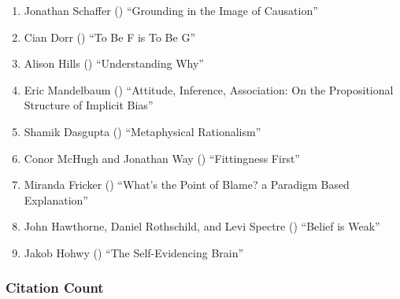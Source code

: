 \documentclass[
  10pt,
  letterpaper,
  DIV=11,
  numbers=noendperiod,
  twoside]{scrartcl}
\providecommand{\tightlist}{%
  \setlength{\itemsep}{0pt}\setlength{\parskip}{0pt}}\usepackage{longtable,booktabs,array}
\begin{document}
\begin{enumerate}
\def\labelenumi{\arabic{enumi}.}
\tightlist
\item
  Jonathan Schaffer ()
  ``Grounding in the Image of Causation''
\item
  Cian Dorr () ``To Be F is To Be
  G''
\item
  Alison Hills () ``Understanding
  Why''
\item
  Eric Mandelbaum () ``Attitude,
  Inference, Association: On the Propositional Structure of Implicit
  Bias''
\item
  Shamik Dasgupta ()
  ``Metaphysical Rationalism''
\item
  Conor McHugh and Jonathan Way
  () ``Fittingness First''
\item
  Miranda Fricker () ``What's the
  Point of Blame? a Paradigm Based Explanation''
\item
  John Hawthorne, Daniel Rothschild, and Levi Spectre
  () ``Belief is Weak''
\item
  Jakob Hohwy () ``The
  Self-Evidencing Brain''
\end{enumerate}

\subsubsection*{Citation Count}\label{sec-count-2016}
\end{document}
